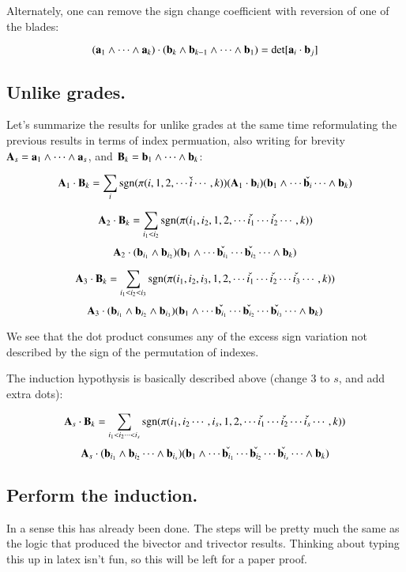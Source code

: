 \documentclass{article}      %
\begin{document}
Alternately, one can remove the sign change coefficient with reversion of one of the blades:

\begin{equation}\label{eqn:bladedothyprev}
(\mathbf{a}_1 \wedge \cdots \wedge \mathbf{a}_k) \cdot (\mathbf{b}_k \wedge \mathbf{b}_{k-1} \wedge \cdots \wedge \mathbf{b}_1) = \det[\mathbf{a}_i \cdot \mathbf{b}_j]
\end{equation}

\subsection{ Unlike grades. }

Let's summarize the results for unlike grades at the same time reformulating the previous results in terms of index
permuation, also writing for brevity $\mathbf{A}_s = \mathbf{a}_1 \wedge \cdots \wedge \mathbf{a}_s$, and $\mathbf{B}_k = \mathbf{b}_1 \wedge \cdots \wedge \mathbf{b}_k$:

\[
\mathbf{A}_1 \cdot \mathbf{B}_k =
\sum_i \operatorname{sgn}(\pi(i,1,2,\cdots\check{i}\cdots,k)) (\mathbf{A}_1 \cdot \mathbf{b}_i) (\mathbf{b}_1 \wedge \cdots \check{\mathbf{b}_i} \cdots \wedge \mathbf{b}_k) 
\]

\[
\mathbf{A}_2 \cdot \mathbf{B}_k =
\sum_{i_1<i_2} \operatorname{sgn}(\pi(i_1,i_2,1,2,\cdots\check{i_1}\cdots\check{i_2}\cdots,k)) 
\]
\[
   \mathbf{A}_2 \cdot (\mathbf{b}_{i_1} \wedge \mathbf{b}_{i_2})
   (\mathbf{b}_1 \wedge \cdots \check{\mathbf{b}_{i_1}} \cdots \check{\mathbf{b}_{i_2}} \cdots \wedge \mathbf{b}_k)
\]

\[
\mathbf{A}_3 \cdot \mathbf{B}_k =
\sum_{i_1<i_2<i_3} \operatorname{sgn}(\pi(i_1,i_2,i_3,1,2,\cdots\check{i_1}\cdots\check{i_2}\cdots\check{i_3}\cdots,k)) 
\]
\[
\mathbf{A}_3 \cdot (\mathbf{b}_{i_1} \wedge \mathbf{b}_{i_2} \wedge \mathbf{b}_{i_3})
(\mathbf{b}_1 \wedge \cdots \check{\mathbf{b}_{i_1}} \cdots \check{\mathbf{b}_{i_2}} \cdots \check{\mathbf{b}_{i_3}} \cdots \wedge \mathbf{b}_k) 
\]

We see that the dot product consumes any of the excess sign variation not described by the sign of the permutation of indexes.

The induction hypothysis is basically described above (change $3$ to $s$, and add extra dots):

\begin{equation*}
\mathbf{A}_s \cdot \mathbf{B}_k =
\sum_{i_1<i_2\cdots<i_s} \operatorname{sgn}(\pi(i_1,i_2\cdots,i_s,1,2,\cdots\check{i_1}\cdots\check{i_2}\cdots\check{i_s}\cdots,k)) 
\end{equation*}
\begin{equation}\label{eqn:inductionbigdotblade}
\mathbf{A}_s \cdot (\mathbf{b}_{i_1} \wedge \mathbf{b}_{i_2} \cdots \wedge \mathbf{b}_{i_s})
(\mathbf{b}_1 \wedge \cdots \check{\mathbf{b}_{i_1}} \cdots \check{\mathbf{b}_{i_2}} \cdots \check{\mathbf{b}_{i_s}} \cdots \wedge \mathbf{b}_k) 
\end{equation}

\subsection{ Perform the induction. }

In a sense this has already been done.  The steps will be pretty much the same as the logic that produced the bivector and trivector 
results.  Thinking about typing this up in latex isn't fun, so this will be left for a paper proof.
\end{document}
